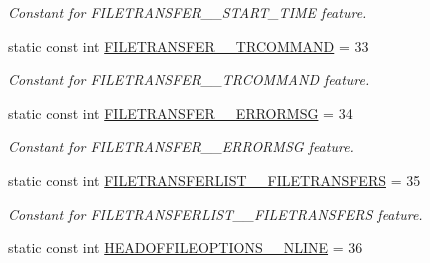 \begin{DoxyCompactItemize}
\begin{DoxyCompactList}\small\item\em Constant for FILETRANSFER\_\-\_\-START\_\-TIME feature. \item\end{DoxyCompactList}\item 
\hypertarget{classFMS__Data_1_1FMS__DataPackage_a1ccade02a3b1e76a2fb3c857d0b12bd9}{
static const int \hyperlink{classFMS__Data_1_1FMS__DataPackage_a1ccade02a3b1e76a2fb3c857d0b12bd9}{FILETRANSFER\_\-\_\-TRCOMMAND} = 33}
\label{classFMS__Data_1_1FMS__DataPackage_a1ccade02a3b1e76a2fb3c857d0b12bd9}

\begin{DoxyCompactList}\small\item\em Constant for FILETRANSFER\_\-\_\-TRCOMMAND feature. \item\end{DoxyCompactList}\item 
\hypertarget{classFMS__Data_1_1FMS__DataPackage_a9c70ad8fa14543567de856e739432f2f}{
static const int \hyperlink{classFMS__Data_1_1FMS__DataPackage_a9c70ad8fa14543567de856e739432f2f}{FILETRANSFER\_\-\_\-ERRORMSG} = 34}
\label{classFMS__Data_1_1FMS__DataPackage_a9c70ad8fa14543567de856e739432f2f}

\begin{DoxyCompactList}\small\item\em Constant for FILETRANSFER\_\-\_\-ERRORMSG feature. \item\end{DoxyCompactList}\item 
\hypertarget{classFMS__Data_1_1FMS__DataPackage_a48725615da4bec7310c7bdc6f6672e8c}{
static const int \hyperlink{classFMS__Data_1_1FMS__DataPackage_a48725615da4bec7310c7bdc6f6672e8c}{FILETRANSFERLIST\_\-\_\-FILETRANSFERS} = 35}
\label{classFMS__Data_1_1FMS__DataPackage_a48725615da4bec7310c7bdc6f6672e8c}

\begin{DoxyCompactList}\small\item\em Constant for FILETRANSFERLIST\_\-\_\-FILETRANSFERS feature. \item\end{DoxyCompactList}\item 
\hypertarget{classFMS__Data_1_1FMS__DataPackage_aa831fb20ea7d9c01596e8f383a76130a}{
static const int \hyperlink{classFMS__Data_1_1FMS__DataPackage_aa831fb20ea7d9c01596e8f383a76130a}{HEADOFFILEOPTIONS\_\-\_\-NLINE} = 36}
\label{classFMS__Data_1_1FMS__DataPackage_aa831fb20ea7d9c01596e8f383a76130a}


\end{DoxyCompactItemize}
